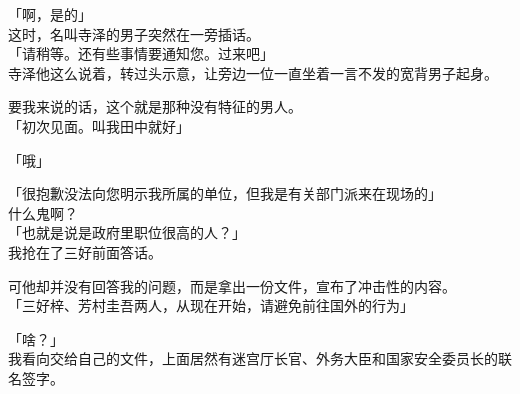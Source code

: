 「啊，是的」\\

这时，名叫寺泽的男子突然在一旁插话。\\

「请稍等。还有些事情要通知您。过来吧」\\

寺泽他这么说着，转过头示意，让旁边一位一直坐着一言不发的宽背男子起身。

要我来说的话，这个就是那种没有特征的男人。\\

「初次见面。叫我田中就好」

「哦」

「很抱歉没法向您明示我所属的单位，但我是有关部门派来在现场的」\\

什么鬼啊？\\

「也就是说是政府里职位很高的人？」\\

我抢在了三好前面答话。

可他却并没有回答我的问题，而是拿出一份文件，宣布了冲击性的内容。\\

「三好梓、芳村圭吾两人，从现在开始，请避免前往国外的行为」

「啥？」\\

我看向交给自己的文件，上面居然有迷宫厅长官、外务大臣和国家安全委员长的联名签字。

